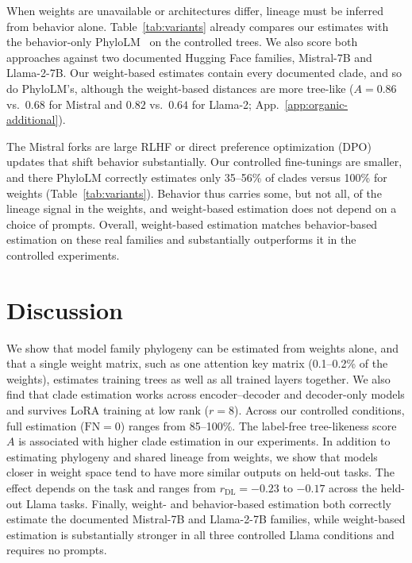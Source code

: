 \documentclass{article}
\theoremstyle{definition}
\theoremstyle{plain}
\begin{document}
When weights are unavailable or architectures differ, lineage must be inferred from behavior alone. Table~\ref{tab:variants} already compares our estimates with the behavior-only PhyloLM~\citep{yax2025phylolm} on the controlled trees. We also score both approaches against two documented Hugging Face families, Mistral-7B and Llama-2-7B. Our weight-based estimates contain every documented clade, and so do PhyloLM's, although the weight-based distances are more tree-like ($A=0.86$ vs.\ $0.68$ for Mistral and $0.82$ vs.\ $0.64$ for Llama-2; App.~\ref{app:organic-additional}).

The Mistral forks are large RLHF or direct preference optimization (DPO) updates that shift behavior substantially. Our controlled fine-tunings are smaller, and there PhyloLM correctly estimates only 35--56\% of clades versus 100\% for weights (Table~\ref{tab:variants}). Behavior thus carries some, but not all, of the lineage signal in the weights, and weight-based estimation does not depend on a choice of prompts. Overall, weight-based estimation matches behavior-based estimation on these real families and substantially outperforms it in the controlled experiments.

\section{Discussion}
\label{sec:discussion}

We show that model family phylogeny can be estimated from weights alone, and that a single weight matrix, such as one attention key matrix (0.1--0.2\% of the weights), estimates training trees as well as all trained layers together. We also find that clade estimation works across encoder--decoder and decoder-only models and survives LoRA training at low rank ($r=8$). Across our controlled conditions, full estimation ($\mathrm{FN}=0$) ranges from 85--100\%. The label-free tree-likeness score $A$ is associated with higher clade estimation in our experiments. In addition to estimating phylogeny and shared lineage from weights, we show that models closer in weight space tend to have more similar outputs on held-out tasks. The effect depends on the task and ranges from $r_{\mathrm{DL}}=-0.23$ to $-0.17$ across the held-out Llama tasks. Finally, weight- and behavior-based estimation both correctly estimate the documented Mistral-7B and Llama-2-7B families, while weight-based estimation is substantially stronger in all three controlled Llama conditions and requires no prompts.
\end{document}
